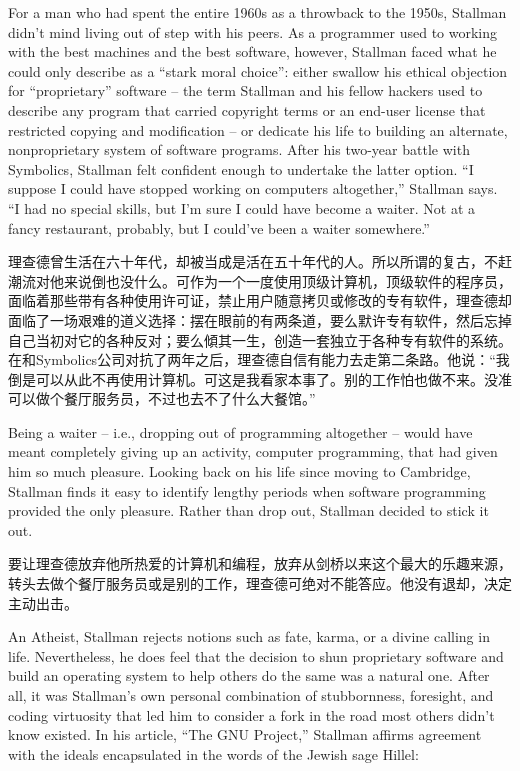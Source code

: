 \ifdefined\eng
For a man who had spent the entire 1960s as a throwback to the 1950s, Stallman didn't mind living out of step with his peers. As a programmer used to working with the best machines and the best software, however, Stallman faced what he could only describe as a ``stark moral choice'': either swallow his ethical objection for ``proprietary'' software -- the term Stallman and his fellow hackers used to describe any program that carried copyright terms or an end-user license that restricted copying and modification -- or dedicate his life to building an alternate, nonproprietary system of software programs. After his two-year battle with Symbolics, Stallman felt confident enough to undertake the latter option. ``I suppose I could have stopped working on computers altogether,'' Stallman says. ``I had no special skills, but I'm sure I could have become a waiter. Not at a fancy restaurant, probably, but I could've been a waiter somewhere.''
\fi

\ifdefined\chs
理查德曾生活在六十年代，却被当成是活在五十年代的人。所以所谓的复古，不赶潮流对他来说倒也没什么。可作为一个一度使用顶级计算机，顶级软件的程序员，面临着那些带有各种使用许可证，禁止用户随意拷贝或修改的专有软件，理查德却面临了一场艰难的道义选择：摆在眼前的有两条道，要么默许专有软件，然后忘掉自己当初对它的各种反对；要么傾其一生，创造一套独立于各种专有软件的系统。在和Symbolics公司对抗了两年之后，理查德自信有能力去走第二条路。他说：``我倒是可以从此不再使用计算机。可这是我看家本事了。别的工作怕也做不来。没准可以做个餐厅服务员，不过也去不了什么大餐馆。''
\fi

\ifdefined\eng
Being a waiter -- i.e., dropping out of programming altogether -- would have meant completely giving up an activity, computer programming, that had given him so much pleasure. Looking back on his life since moving to Cambridge, Stallman finds it easy to identify lengthy periods when software programming provided the only pleasure. Rather than drop out, Stallman decided to stick it out.
\fi

\ifdefined\chs
要让理查德放弃他所热爱的计算机和编程，放弃从剑桥以来这个最大的乐趣来源，转头去做个餐厅服务员或是别的工作，理查德可绝对不能答应。他没有退却，决定主动出击。
\fi

\ifdefined\eng
An Atheist, Stallman rejects notions such as fate, karma, or a divine calling in life. Nevertheless, he does feel that the decision to shun proprietary software and build an operating system to help others do the same was a natural one. After all, it was Stallman's own personal combination of stubbornness, foresight, and coding virtuosity that led him to consider a fork in the road most others didn't know existed. In his article, ``The GNU Project,'' Stallman affirms agreement with the ideals encapsulated in the words of the Jewish sage Hillel:
\fi

